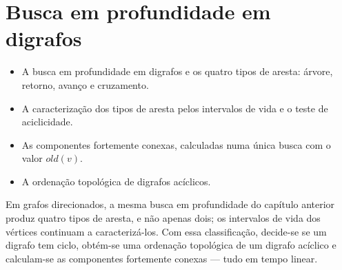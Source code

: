 \chapter{Busca em profundidade em digrafos}\label{cap:dfsdig}\label{sec:dfsdig}
\begin{objetivos}
\begin{itemize}
  \item A busca em profundidade em digrafos e os quatro tipos de aresta: árvore, retorno, avanço e cruzamento.
  \item A caracterização dos tipos de aresta pelos intervalos de vida e o teste de aciclicidade.
  \item As componentes fortemente conexas, calculadas numa única busca com o valor $old(v)$.
  \item A ordenação topológica de digrafos acíclicos.
\end{itemize}
\end{objetivos}

Em grafos direcionados, a mesma busca em profundidade do capítulo anterior produz quatro tipos de aresta, e não apenas dois; os intervalos de vida dos vértices continuam a caracterizá-los. Com essa classificação, decide-se se um digrafo tem ciclo, obtém-se uma ordenação topológica de um digrafo acíclico e calculam-se as componentes fortemente conexas --- tudo em tempo linear.

